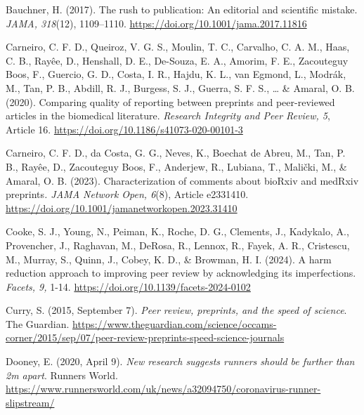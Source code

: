 \documentclass[authordate, perspective]{jote-new-article}
\begin{document}
	Bauchner, H. (2017). The rush to publication: An editorial and scientific mistake. \emph{JAMA, 318}(12), 1109--1110. \url{https://doi.org/10.1001/jama.2017.11816}







	Carneiro, C. F. D., Queiroz, V. G. S., Moulin, T. C., Carvalho, C. A. M., Haas, C. B., Rayêe, D., Henshall, D. E., De-Souza, E. A., Amorim, F. E., Zacouteguy Boos, F., Guercio, G. D., Costa, I. R., Hajdu, K. L., van Egmond, L., Modrák, M., Tan, P. B., Abdill, R. J., Burgess, S. J., Guerra, S. F. S., … \& Amaral, O. B. (2020). Comparing quality of reporting between preprints and peer-reviewed articles in the biomedical literature. \emph{Research Integrity and Peer Review, 5}, Article 16. \url{https://doi.org/10.1186/s41073-020-00101-3}







	Carneiro, C. F. D., da Costa, G. G., Neves, K., Boechat de Abreu, M., Tan, P. B., Rayêe, D., Zacouteguy Boos, F., Anderjew, R., Lubiana, T., Malički, M., \& Amaral, O. B. (2023). Characterization of comments about bioRxiv and medRxiv preprints\emph{. JAMA Network Open, 6}(8), Article e2331410. \url{https://doi.org/10.1001/jamanetworkopen.2023.31410}







	Cooke, S. J., Young, N., Peiman, K., Roche, D. G., Clements, J., Kadykalo, A., Provencher, J., Raghavan, M., DeRosa, R., Lennox, R., Fayek, A. R., Cristescu, M., Murray, S., Quinn, J., Cobey, K. D., \& Browman, H. I. (2024). A harm reduction approach to improving peer review by acknowledging its imperfections. \emph{Facets, 9, }1-14. \url{https://doi.org/10.1139/facets-2024-0102}







	Curry, S. (2015, September 7). \emph{Peer review, preprints, and the speed of science}. The Guardian. \url{https://www.theguardian.com/science/occams-corner/2015/sep/07/peer-review-preprints-speed-science-journals}







	Dooney, E. (2020, April 9). \emph{New research suggests runners should be further than 2m apart}. Runners World. \url{https://www.runnersworld.com/uk/news/a32094750/coronavirus-runner-slipstream/}
\end{document}
